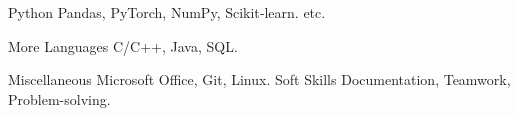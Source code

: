 

\begin{cvskills}

  \cvskill
    {Python} %
    { Pandas, PyTorch, NumPy, Scikit‑learn. etc.} %

  \cvskill
    {More Languages} %
    {C/C++, Java, SQL.} %
    
  \cvskill
    {Miscellaneous} %
    {Microsoft Office, Git, Linux.} %
  \cvskill
    {Soft Skills} %
    {Documentation, Teamwork, Problem-solving.} %

\end{cvskills}
